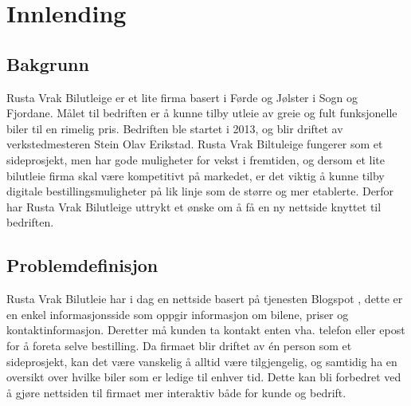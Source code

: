 \chapter{Innlending}
\section{Bakgrunn}



Rusta Vrak Bilutleige er et lite firma basert i Førde og Jølster i Sogn og Fjordane. Målet til bedriften er å kunne tilby utleie av greie og fult funksjonelle biler til en rimelig pris. Bedriften ble startet i 2013, og blir driftet av verkstedmesteren Stein Olav Erikstad. Rusta Vrak Biltuleige fungerer som et sideprosjekt, men har gode muligheter for vekst i fremtiden, og dersom et lite bilutleie firma skal være kompetitivt på markedet, er det viktig å kunne tilby digitale bestillingsmuligheter på lik linje som de større og mer etablerte. Derfor har Rusta Vrak Bilutleige uttrykt et ønske om å få en ny nettside knyttet til bedriften.


\section{Problemdefinisjon}
Rusta Vrak Bilutleie har i dag en nettside basert på tjenesten Blogspot \cite{rv:current}, dette er en enkel informasjonsside som oppgir informasjon om bilene, priser og kontaktinformasjon. Deretter må kunden ta kontakt enten vha. telefon eller epost for å foreta selve bestilling. Da firmaet blir driftet av én person som et sideprosjekt, kan det være vanskelig å alltid være tilgjengelig, og samtidig ha en oversikt over hvilke biler som er ledige til enhver tid. Dette kan bli forbedret ved å gjøre nettsiden til firmaet mer interaktiv både for kunde og bedrift. 

